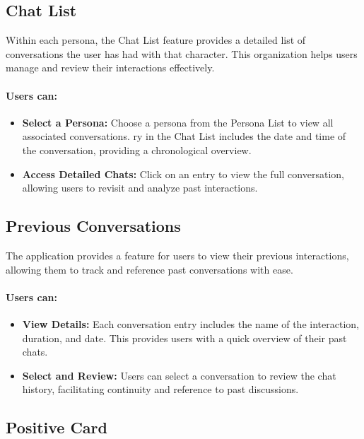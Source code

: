     \subsection{Chat List}

Within each persona, the Chat List feature provides a detailed list of conversations the user has had with that character. This organization helps users manage and review their interactions effectively.

\paragraph{Users can:}

\begin{itemize}
    \item \textbf{Select a Persona:} Choose a persona from the Persona List to view all associated conversations.
    ry in the Chat List includes the date and time of the conversation, providing a chronological overview.
    \item \textbf{Access Detailed Chats:} Click on an entry to view the full conversation, allowing users to revisit and analyze past interactions.
\end{itemize}

\subsection{Previous Conversations}

The application provides a feature for users to view their previous interactions, allowing them to track and reference past conversations with ease.

\paragraph{Users can:}

\begin{itemize}
    \item \textbf{View Details:} Each conversation entry includes the name of the interaction, duration, and date. This provides users with a quick overview of their past chats.
    \item \textbf{Select and Review:} Users can select a conversation to review the chat history, facilitating continuity and reference to past discussions.
\end{itemize}

\subsection{Positive Card}

